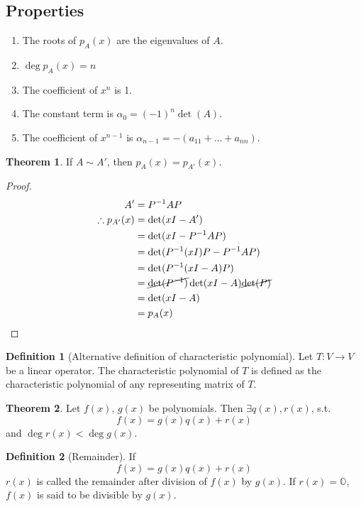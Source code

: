 \documentclass[fleqn, a4paper, 12pt]{article}
\theoremstyle{definition}
\newtheorem{definition}{Definition} %
\theoremstyle{theorem}
\newtheorem{theorem}{Theorem} %
\theoremstyle{remark}
\numberwithin{corollary}{theorem}
\numberwithin{equation}{theorem}
\begin{document}
\subsection{Properties}

\begin{enumerate}
	\item The roots of $p_A (x)$ are the eigenvalues of $A$.
	\item $\deg p_A (x) = n$
	\item The coefficient of $x^n$ is 1.
	\item The constant term is $\alpha_0 = (-1)^n \det (A)$.
	\item The coefficient of $x^{n - 1}$ is $\alpha_{n - 1} = -(a_{11} + \dots + a_{nn})$.
\end{enumerate}

\begin{theorem}
	If $A \sim A'$, then $p_A (x) = p_{A'} (x)$.
\end{theorem}

\begin{proof}
	\begin{align*}
		A' &= P^{-1} A P\\
		\therefore p_{A'} (x) &= \det (xI - A')\\
		&= \det (xI - P^{-1} A P)\\
		&= \det (P^{-1} (xI) P - P^{-1} A P)\\
		&= \det (P^{-1}(xI - A) P)\\
		&= \cancel{\det(P^{-1})} \det(xI - A) \cancel{\det(P)}\\
		&= \det(xI - A)\\
		&= p_A (x)
	\end{align*}
\end{proof}

\begin{definition}[Alternative definition of characteristic polynomial]
	Let $T : V \to V$ be a linear operator. The characteristic polynomial of $T$ is defined as the characteristic polynomial of any representing matrix of $T$.
\end{definition}

\begin{theorem}
	Let $f(x)$, $g(x)$ be polynomials. Then $\exists q(x), r(x)$, s.t.
	\begin{equation*}
		f(x) = g(x) q(x) + r(x)
	\end{equation*}
	and $\deg r(x) < \deg g(x)$.
\end{theorem}

\begin{definition}[Remainder]
	If
	\begin{equation*}
		f(x) = g(x) q(x) + r(x)
	\end{equation*}
	$r(x)$ is called the remainder after division of $f(x)$ by $g(x)$. If $r(x) = \mathbb{O}$, $f(x)$ is said to be divisible by $g(x)$.
\end{definition}
\end{document}
